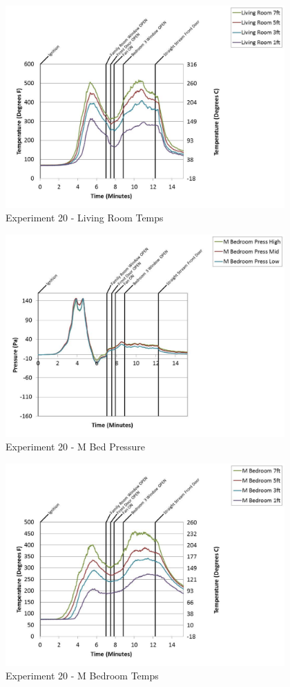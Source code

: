 \documentclass{article}
\begin{document}
\begin{appendices}
	\clearpage

	\begin{figure}[h!]
		\centering
		\includegraphics[height=3.05in]{0_Images/Results_Charts/Exp_20_Charts/LivingRoomTemps.pdf}
		\caption{Experiment 20 - Living Room Temps}
	\end{figure}
 

	\begin{figure}[h!]
		\centering
		\includegraphics[height=3.05in]{0_Images/Results_Charts/Exp_20_Charts/MBedPressure.pdf}
		\caption{Experiment 20 - M Bed Pressure}
	\end{figure}
 
	\clearpage

	\begin{figure}[h!]
		\centering
		\includegraphics[height=3.05in]{0_Images/Results_Charts/Exp_20_Charts/MBedroomTemps.pdf}
		\caption{Experiment 20 - M Bedroom Temps}
	\end{figure}
 


\end{appendices}
\end{document}
